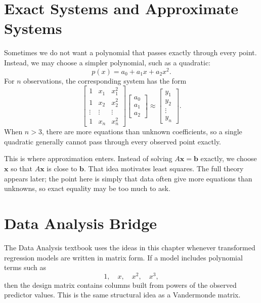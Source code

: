 \section{Exact Systems and Approximate Systems}
\label{mf:overdetermined-systems}
\label{mf:least-squares-motivation}

Sometimes we do not want a polynomial that passes exactly through every point. Instead, we may choose a simpler polynomial, such as a quadratic:
\[
    p(x)=a_0+a_1x+a_2x^2.
\]
For \(n\) observations, the corresponding system has the form
\[
    \begin{bmatrix}
        1 & x_1 & x_1^2\\
        1 & x_2 & x_2^2\\
        \vdots & \vdots & \vdots\\
        1 & x_n & x_n^2
    \end{bmatrix}
    \begin{bmatrix}
        a_0\\a_1\\a_2
    \end{bmatrix}
    \approx
    \begin{bmatrix}
        y_1\\y_2\\ \vdots\\ y_n
    \end{bmatrix}.
\]
When \(n>3\), there are more equations than unknown coefficients, so a single quadratic generally cannot pass through every observed point exactly.

This is where approximation enters. Instead of solving \(A\mathbf{x}=\mathbf{b}\) exactly, we choose \(\mathbf{x}\) so that \(A\mathbf{x}\) is close to \(\mathbf{b}\). That idea motivates least squares. The full theory appears later; the point here is simply that data often give more equations than unknowns, so exact equality may be too much to ask.

\section{Data Analysis Bridge}
\label{mf:ch08-data-analysis-bridge}

The Data Analysis textbook uses the ideas in this chapter whenever transformed regression models are written in matrix form. If a model includes polynomial terms such as
\[
    1,\quad x,\quad x^2,\quad x^3,
\]
then the design matrix contains columns built from powers of the observed predictor values. This is the same structural idea as a Vandermonde matrix.

